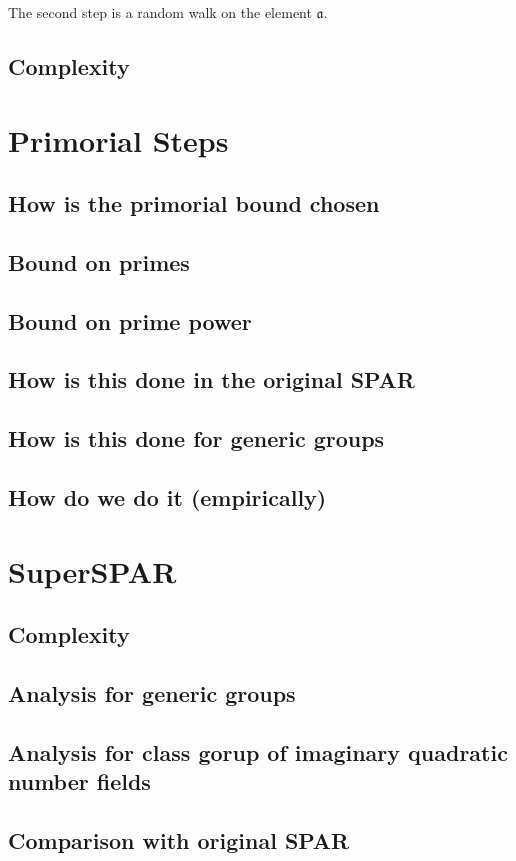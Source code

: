 \documentclass{ucalgthes1}
\theoremstyle{plain}
\theoremstyle{definition}
\begin{document}
The second step is a random walk on the element $\mathfrak a$.

\pagebreak

\subsection{Complexity}


\section{Primorial Steps}

\subsection{How is the primorial bound chosen}

\subsection{Bound on primes}

\subsection{Bound on prime power}

\subsection{How is this done in the original SPAR}

\subsection{How is this done for generic groups}

\subsection{How do we do it (empirically)}


\section{SuperSPAR}

\subsection{Complexity}
\subsection{Analysis for generic groups}
\subsection{Analysis for class gorup of imaginary quadratic number fields}
\subsection{Comparison with original SPAR}
\end{document}
